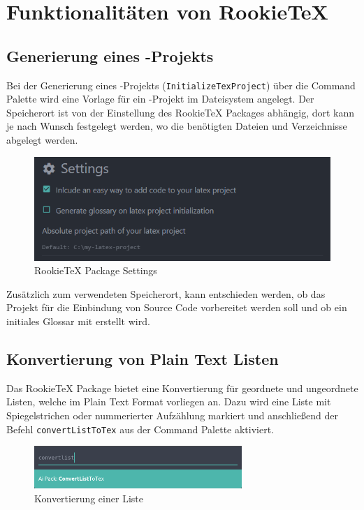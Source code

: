     \section{Funktionalitäten von RookieTeX}
        \subsection{Generierung eines \latex-Projekts}
            Bei der Generierung eines \latex-Projekts (\texttt{InitializeTexProject}) über die Command Palette wird eine Vorlage für ein \latex-Projekt im Dateisystem angelegt. Der Speicherort ist von der Einstellung des RookieTeX Packages abhängig, dort kann je nach Wunsch festgelegt werden, wo die benötigten Dateien und Verzeichnisse abgelegt werden.
            \begin{figure}[H]
                \centering
                \includegraphics[width=\textwidth]{img/package_settings.png}
                \caption{RookieTeX Package Settings}
            \end{figure}
            Zusätzlich zum verwendeten Speicherort, kann entschieden werden, ob das Projekt für die Einbindung von Source Code vorbereitet werden soll und ob ein initiales Glossar mit erstellt wird.

        \subsection{Konvertierung von Plain Text Listen}
            Das RookieTeX Package bietet eine Konvertierung für geordnete und ungeordnete Listen, welche im Plain Text Format vorliegen an. Dazu wird eine Liste mit Spiegelstrichen oder nummerierter Aufzählung markiert und anschließend der Befehl \texttt{convertListToTex} aus der Command Palette aktiviert.
            \\[5mm]
            \begin{figure}[H]
                \centering
                \includegraphics[width=0.7\textwidth]{img/convert_list_cp.png}
                \caption{Konvertierung einer Liste}
            \end{figure}

